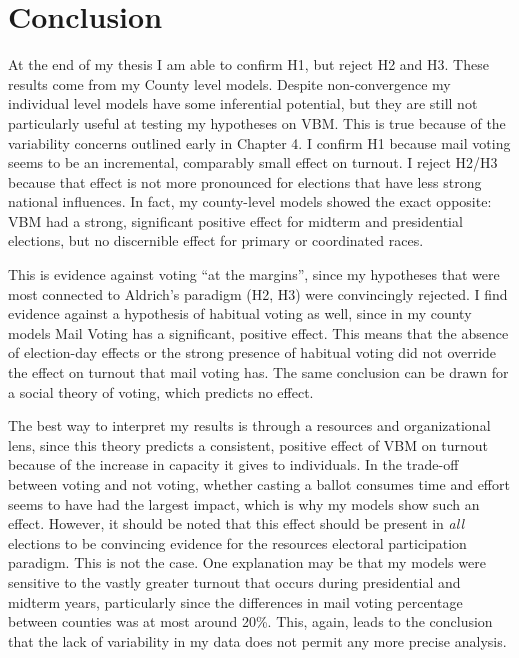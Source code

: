 \documentclass[]{article}
\title{}
\author{}
\date{}
\begin{document}
\section*{Conclusion}\label{conclusion}

\setcounter{chapter}{5} \setcounter{section}{0}

At the end of my thesis I am able to confirm H1, but reject H2 and H3.
These results come from my County level models. Despite non-convergence
my individual level models have some inferential potential, but they are
still not particularly useful at testing my hypotheses on VBM. This is
true because of the variability concerns outlined early in Chapter 4. I
confirm H1 because mail voting seems to be an incremental, comparably
small effect on turnout. I reject H2/H3 because that effect is not more
pronounced for elections that have less strong national influences. In
fact, my county-level models showed the exact opposite: VBM had a
strong, significant positive effect for midterm and presidential
elections, but no discernible effect for primary or coordinated races.

This is evidence against voting ``at the margins'', since my hypotheses
that were most connected to Aldrich's paradigm (H2, H3) were
convincingly rejected. I find evidence against a hypothesis of habitual
voting as well, since in my county models Mail Voting has a significant,
positive effect. This means that the absence of election-day effects or
the strong presence of habitual voting did not override the effect on
turnout that mail voting has. The same conclusion can be drawn for a
social theory of voting, which predicts no effect.

The best way to interpret my results is through a resources and
organizational lens, since this theory predicts a consistent, positive
effect of VBM on turnout because of the increase in capacity it gives to
individuals. In the trade-off between voting and not voting, whether
casting a ballot consumes time and effort seems to have had the largest
impact, which is why my models show such an effect. However, it should
be noted that this effect should be present in \emph{all} elections to
be convincing evidence for the resources electoral participation
paradigm. This is not the case. One explanation may be that my models
were sensitive to the vastly greater turnout that occurs during
presidential and midterm years, particularly since the differences in
mail voting percentage between counties was at most around 20\%. This,
again, leads to the conclusion that the lack of variability in my data
does not permit any more precise analysis.
\end{document}

